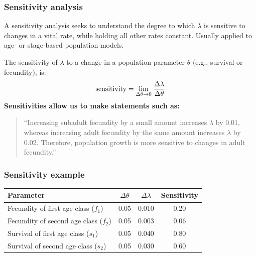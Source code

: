 \documentclass[color=usenames,dvipsnames]{beamer}\usepackage[]{graphicx}\usepackage[]{xcolor}
\begin{document}
\begin{frame}
  \frametitle{Sensitivity analysis}
  A sensitivity analysis seeks to understand the degree to which
  $\lambda$ is sensitive to changes in a vital rate, while holding all
  other rates constant.
  \pause
  \vfill
  Usually applied to age- or stage-based population models. \par
  \pause
  \vfill
  The sensitivity of $\lambda$ to a change in a population parameter
  $\theta$ (e.g., survival or fecundity), is:
  \[
    \text{sensitivity} = {\small \lim\limits_{\Delta \theta \to 0}}\; \frac{\Delta \lambda}{\Delta \theta}
  \]
  \pause
  \vfill
  {\bf Sensitivities allow us to make statements such as:} \\
  \begin{quote}
  ``Increasing subadult fecundity by a small amount increases
  $\lambda$ by 0.01, whereas increasing adult fecundity by the same
  amount increases $\lambda$ by 0.02. Therefore, population growth is
  more sensitive to changes in adult fecundity.''
  \end{quote}
\end{frame}



\begin{frame}
  \frametitle{Sensitivity example}
  \centering
  \small
  \begin{tabular}{lccc}
    \hline
    Parameter & $\Delta \theta$ & $\Delta \lambda$ & Sensitivity \\
    \hline
    Fecundity of first age class ($f_1$)  & 0.05 & 0.010 & 0.20 \\ %
    Fecundity of second age class ($f_2$) & 0.05 & 0.003 & 0.06 \\ %
    Survival of first age class ($s_1$)   & 0.05 & 0.040 & 0.80 \\ %
    Survival of second age class ($s_2$)   & 0.05 & 0.030 & 0.60 \\
    \hline
  \end{tabular}
\end{frame}
\end{document}
